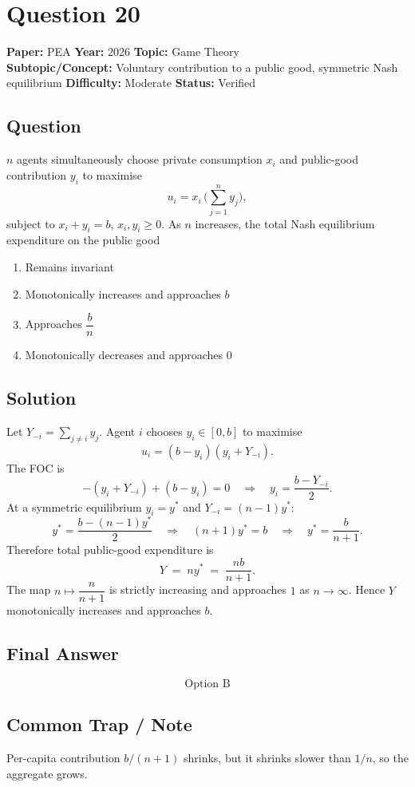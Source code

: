 \documentclass[11pt]{article}
\begin{document}
\section*{Question 20}
\textbf{Paper:} PEA \quad \textbf{Year:} 2026 \quad \textbf{Topic:} Game Theory \\
\textbf{Subtopic/Concept:} Voluntary contribution to a public good, symmetric Nash equilibrium \quad
\textbf{Difficulty:} Moderate \quad \textbf{Status:} Verified

\subsection*{Question}
$n$ agents simultaneously choose private consumption $x_i$ and public-good
contribution $y_i$ to maximise
\[
u_i = x_i\, \Big(\sum_{j=1}^n y_j\Big),
\]
subject to $x_i + y_i = b$, $x_i, y_i \ge 0$. As $n$ increases, the total Nash
equilibrium expenditure on the public good
\begin{enumerate}[label=(\Alph*)]
\item Remains invariant
\item Monotonically increases and approaches $b$
\item Approaches $\dfrac{b}{n}$
\item Monotonically decreases and approaches $0$
\end{enumerate}

\subsection*{Solution}
Let $Y_{-i} = \sum_{j\ne i} y_j$. Agent $i$ chooses $y_i \in [0,b]$ to maximise
\[
u_i = (b - y_i)(y_i + Y_{-i}).
\]
The FOC is
\[
-(y_i + Y_{-i}) + (b - y_i) = 0 \quad\Longrightarrow\quad y_i = \frac{b - Y_{-i}}{2}.
\]
At a symmetric equilibrium $y_i = y^*$ and $Y_{-i} = (n-1) y^*$:
\[
y^* = \frac{b - (n-1) y^*}{2} \quad\Longrightarrow\quad (n+1) y^* = b
\quad\Longrightarrow\quad y^* = \frac{b}{n+1}.
\]
Therefore total public-good expenditure is
\[
Y \;=\; n y^* \;=\; \frac{n b}{n + 1}.
\]
The map $n \mapsto \dfrac{n}{n+1}$ is strictly increasing and approaches $1$ as
$n\to\infty$. Hence $Y$ monotonically increases and approaches $b$.

\subsection*{Final Answer}
\[
\boxed{\text{Option B}}
\]

\subsection*{Common Trap / Note}
Per-capita contribution $b/(n+1)$ shrinks, but it shrinks slower than $1/n$, so
the aggregate grows.
\end{document}
